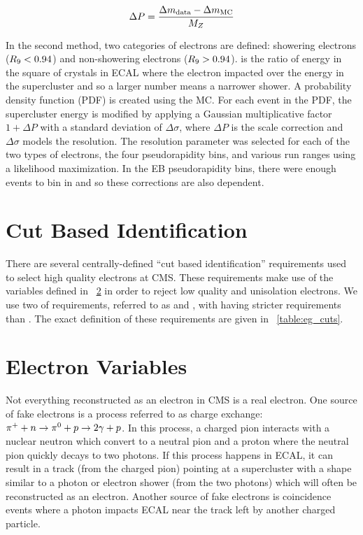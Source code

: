 \begin{equation} \label{eq:scale_correction}
    \Delta P = \frac{\Delta m_{\text{data}} - \Delta m_{\text{MC}}}{M_{Z}}
\end{equation}

In the second method, two categories of electrons are defined: showering
electrons ($R_{9} < 0.94$) and non-showering electrons ($R_{9} > 0.94$).
\RNine is the ratio of energy in the \threebythree square of crystals in ECAL
where the electron impacted over the energy in the supercluster and so a larger
number means a narrower shower. A probability density function (PDF) is created
using the \Ztoee MC. For each event in the PDF, the supercluster energy is
modified by applying a Gaussian multiplicative factor $1+\Delta P$ with a
standard deviation of $\Delta \sigma$, where $\Delta P$ is the scale correction
and $\Delta \sigma$ models the resolution. The resolution parameter was
selected for each of the two types of electrons, the four pseudorapidity bins,
and various run ranges using a likelihood maximization. In the EB
pseudorapidity bins, there were enough events to bin in \ET and so these
corrections are also \ET dependent.

\section{Cut Based Identification}
\label{sec:cut_based_id}

There are several centrally-defined ``cut based identification'' requirements
used to select high quality electrons at CMS. These requirements make use of
the variables defined in \SEC~\ref{sec:electron_variables} in order to
reject low quality and unisolation electrons. We use two of requirements,
referred to as \EGMEDIUM and \EGTIGHT, with \EGTIGHT having stricter
requirements than \EGMEDIUM. The exact definition of these requirements are
given in
\TAB~\ref{table:eg_cuts}.



\section{Electron Variables}
\label{sec:electron_variables}

Not everything reconstructed as an electron in CMS is a real electron. One
source of fake electrons is a process referred to as charge exchange:
$\pi^{+} + n \to \pi^{0} + p \to 2 \gamma + p$. In this process, a charged pion
interacts with a nuclear neutron which convert to a neutral pion and a proton
where the neutral pion quickly decays to two photons. If this process happens
in ECAL, it can result in a track (from the charged
pion) pointing at a supercluster with a shape similar to a photon or electron
shower (from the two photons) which will often be reconstructed as an electron.
Another source of fake electrons is coincidence events where a photon impacts
ECAL near the track left by another charged particle.

